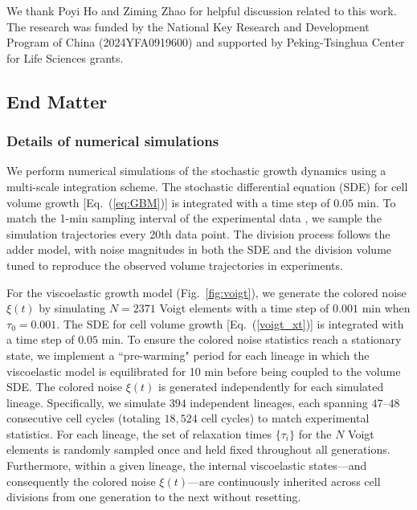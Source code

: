 \documentclass[aps, prl, twocolumn, longbibliography, linenumbers, superscriptaddress]{revtex4-2}
\newcommand{\blue}{\color{blue}}
\begin{document}

\begin{acknowledgments}
	We thank Poyi Ho and Ziming Zhao for helpful discussion related to this work. The research was funded by the National Key Research and Development Program of China (2024YFA0919600) and supported by Peking-Tsinghua Center for Life Sciences grants.
\end{acknowledgments}



\subsection{End Matter}
\subsubsection{Details of numerical simulations}
We perform numerical simulations of the stochastic growth dynamics using a multi-scale integration scheme. The stochastic differential equation (SDE) for cell volume growth [Eq.~(\ref{eq:GBM})] is integrated with a time step of $ 0.05$ min. To match the 1-min sampling interval of the experimental data \cite{Taheri2015cell}, we sample the simulation trajectories every 20th data point. The division process follows the adder model, with noise magnitudes in both the SDE and the division volume tuned to reproduce the observed volume trajectories in experiments.

For the viscoelastic growth model (Fig.~\ref{fig:voigt}), we generate the colored noise $\xi(t)$ by simulating $N=2371$ Voigt elements with a time step of $0.001$ min when $\tau_0 = 0.001$. The SDE for cell volume growth [Eq.~(\ref{voigt_xt})] is integrated with a time step of $0.05$ min. To ensure the colored noise statistics reach a stationary state, we implement a ``pre-warming" period for each lineage in which the viscoelastic model is equilibrated for 10 min before being coupled to the volume SDE. The colored noise $\xi(t)$ is generated independently for each simulated lineage. {\blue Specifically, we simulate $394$ independent lineages, each spanning $47$--$48$ consecutive cell cycles (totaling $18,524$ cell cycles) to match experimental statistics. For each lineage, the set of relaxation times $\{\tau_i\}$ for the $N$ Voigt elements is randomly sampled once and held fixed throughout all generations. Furthermore, within a given lineage, the internal viscoelastic states—and consequently the colored noise $\xi(t)$—are continuously inherited across cell divisions from one generation to the next without resetting.}
\end{document}
